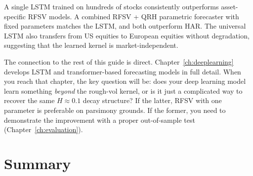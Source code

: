 \begin{keyresult}
A single LSTM trained on hundreds of stocks consistently outperforms asset-specific RFSV models.
A combined RFSV + QRH parametric forecaster with fixed parameters matches the LSTM, and both outperform HAR.
The universal LSTM also transfers from US equities to European equities without degradation, suggesting that the learned kernel is market-independent.
\end{keyresult}

The connection to the rest of this guide is direct.
Chapter~\ref{ch:deeplearning} develops LSTM and transformer-based forecasting models in full detail.
When you reach that chapter, the key question will be: does your deep learning model learn something \emph{beyond} the rough-vol kernel, or is it just a complicated way to recover the same $H \approx 0.1$ decay structure?
If the latter, RFSV with one parameter is preferable on parsimony grounds.
If the former, you need to demonstrate the improvement with a proper out-of-sample test (Chapter~\ref{ch:evaluation}).


\section*{Summary}

